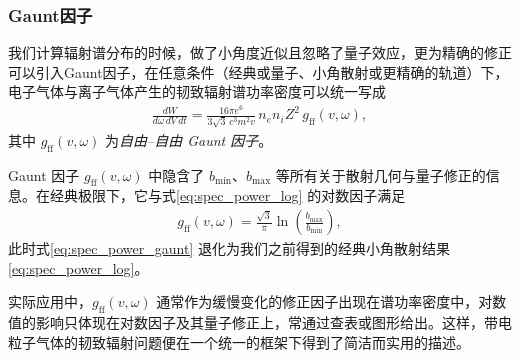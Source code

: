 \subsubsection{Gaunt因子}
我们计算辐射谱分布的时候，做了小角度近似且忽略了量子效应，更为精确的修正可以引入Gaunt因子，在任意条件（经典或量子、小角散射或更精确的轨道）下，电子气体与离子气体产生的韧致辐射谱功率密度可以统一写成
  \begin{align}
    \frac{dW}{d\omega\,dV\,dt}
    = \frac{16\pi e^{6}}{3\sqrt{3}\,c^{3}m^{2}v}\,
      n_e n_i Z^{2}\,
      g_{\mathrm{ff}}(v,\omega),
    \label{eq:spec_power_gaunt}
  \end{align}
  其中 $g_{\mathrm{ff}}(v,\omega)$ 为\emph{自由--自由 Gaunt 因子}。

Gaunt 因子 $g_{\mathrm{ff}}(v,\omega)$ 中隐含了 $b_{\min}$、$b_{\max}$ 等所有关于散射几何与量子修正的信息。在经典极限下，它与式\eqref{eq:spec_power_log} 的对数因子满足
\begin{align}
  g_{\mathrm{ff}}(v,\omega)
  = \frac{\sqrt{3}}{\pi}
    \ln\!\left(\frac{b_{\max}}{b_{\min}}\right),
  \label{eq:gaunt_classical}
\end{align}
此时式\eqref{eq:spec_power_gaunt} 退化为我们之前得到的经典小角散射结果\eqref{eq:spec_power_log}。

实际应用中，$g_{\mathrm{ff}}(v,\omega)$ 通常作为缓慢变化的修正因子出现在谱功率密度中，对数值的影响只体现在对数因子及其量子修正上，常通过查表或图形给出。这样，带电粒子气体的韧致辐射问题便在一个统一的框架下得到了简洁而实用的描述。

